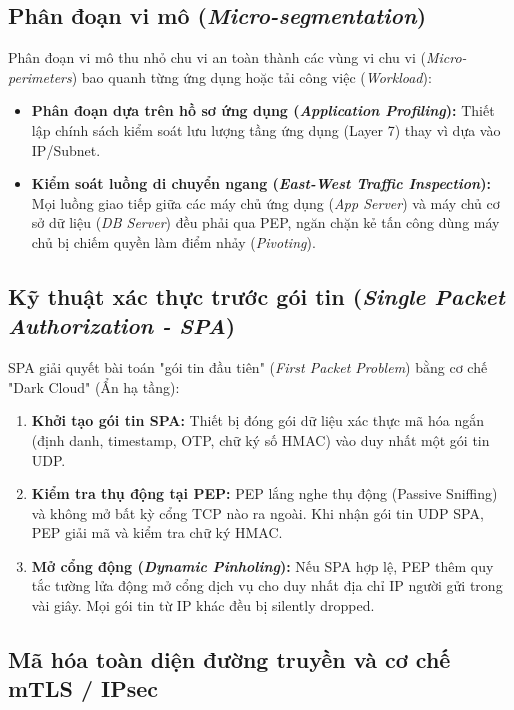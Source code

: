 \subsection{Phân đoạn vi mô (\textit{Micro-segmentation})}
Phân đoạn vi mô thu nhỏ chu vi an toàn thành các vùng vi chu vi (\textit{Micro-perimeters}) bao quanh từng ứng dụng hoặc tải công việc (\textit{Workload}):
\begin{itemize}
    \item \textbf{Phân đoạn dựa trên hồ sơ ứng dụng (\textit{Application Profiling}):} Thiết lập chính sách kiểm soát lưu lượng tầng ứng dụng (Layer 7) thay vì dựa vào IP/Subnet.
    \item \textbf{Kiểm soát luồng di chuyển ngang (\textit{East-West Traffic Inspection}):} Mọi luồng giao tiếp giữa các máy chủ ứng dụng (\textit{App Server}) và máy chủ cơ sở dữ liệu (\textit{DB Server}) đều phải qua PEP, ngăn chặn kẻ tấn công dùng máy chủ bị chiếm quyền làm điểm nhảy (\textit{Pivoting}).
\end{itemize}

\subsection{Kỹ thuật xác thực trước gói tin (\textit{Single Packet Authorization - SPA})}
SPA giải quyết bài toán "gói tin đầu tiên" (\textit{First Packet Problem}) bằng cơ chế "Dark Cloud" (Ẩn hạ tầng):
\begin{enumerate}
    \item \textbf{Khởi tạo gói tin SPA:} Thiết bị đóng gói dữ liệu xác thực mã hóa ngắn (định danh, timestamp, OTP, chữ ký số HMAC) vào duy nhất một gói tin UDP.
    \item \textbf{Kiểm tra thụ động tại PEP:} PEP lắng nghe thụ động (Passive Sniffing) và không mở bất kỳ cổng TCP nào ra ngoài. Khi nhận gói tin UDP SPA, PEP giải mã và kiểm tra chữ ký HMAC.
    \item \textbf{Mở cổng động (\textit{Dynamic Pinholing}):} Nếu SPA hợp lệ, PEP thêm quy tắc tường lửa động mở cổng dịch vụ cho duy nhất địa chỉ IP người gửi trong vài giây. Mọi gói tin từ IP khác đều bị silently dropped.
\end{enumerate}

\subsection{Mã hóa toàn diện đường truyền và cơ chế mTLS / IPsec}
\label{subsec:2_3_3}

